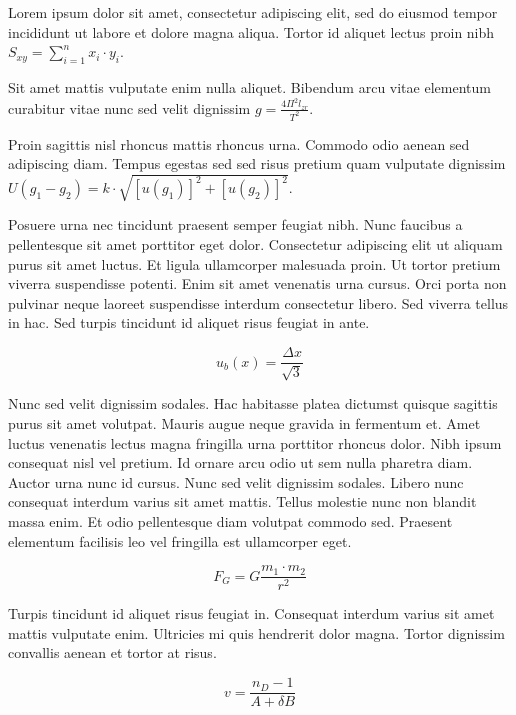 \documentclass{article}
\begin{document}
	
    Lorem ipsum dolor sit amet, consectetur adipiscing elit, sed do eiusmod tempor incididunt ut labore et dolore magna aliqua. Tortor id aliquet lectus proin nibh 
    \begin{math}
    	S_{xy}=\sum_{i=1}^{n}x_i\cdot y_i
    \end{math}.
    \newline
    
    Sit amet mattis vulputate enim nulla aliquet. Bibendum arcu vitae elementum curabitur vitae nunc sed velit dignissim $ g=\frac{4\Pi^2l_{zr}}{T^2} $.
    \newline
    
   Proin sagittis nisl rhoncus mattis rhoncus urna. Commodo odio aenean sed adipiscing diam. Tempus egestas sed sed risus pretium quam vulputate dignissim \( U(g_1-g_2)=k\cdot \sqrt{[u(g_1)]^2+[u(g_2)]^2} \).
   \newline
    
    Posuere urna nec tincidunt praesent semper feugiat nibh. Nunc faucibus a pellentesque sit amet porttitor eget dolor. Consectetur adipiscing elit ut aliquam purus sit amet luctus. Et ligula ullamcorper malesuada proin. Ut tortor pretium viverra suspendisse potenti. Enim sit amet venenatis urna cursus. Orci porta non pulvinar neque laoreet suspendisse interdum consectetur libero. Sed viverra tellus in hac. Sed turpis tincidunt id aliquet risus feugiat in ante.
    
    \[ u_b(x)=\frac{\Delta x}{\sqrt{3}}  \]
    
    Nunc sed velit dignissim sodales. Hac habitasse platea dictumst quisque sagittis purus sit amet volutpat. Mauris augue neque gravida in fermentum et. Amet luctus venenatis lectus magna fringilla urna porttitor rhoncus dolor. Nibh ipsum consequat nisl vel pretium. Id ornare arcu odio ut sem nulla pharetra diam. Auctor urna nunc id cursus. Nunc sed velit dignissim sodales. Libero nunc consequat interdum varius sit amet mattis. Tellus molestie nunc non blandit massa enim. Et odio pellentesque diam volutpat commodo sed. Praesent elementum facilisis leo vel fringilla est ullamcorper eget.
    
    $$ F_{G}=G\frac{m_1\cdot m_2}{r^2} $$
    
    Turpis tincidunt id aliquet risus feugiat in. Consequat interdum varius sit amet mattis vulputate enim. Ultricies mi quis hendrerit dolor magna. Tortor dignissim convallis aenean et tortor at risus. 
    
    \begin{displaymath}
    	v=\frac{n_D-1}{A+\delta B}
    \end{displaymath}
    
\end{document}
